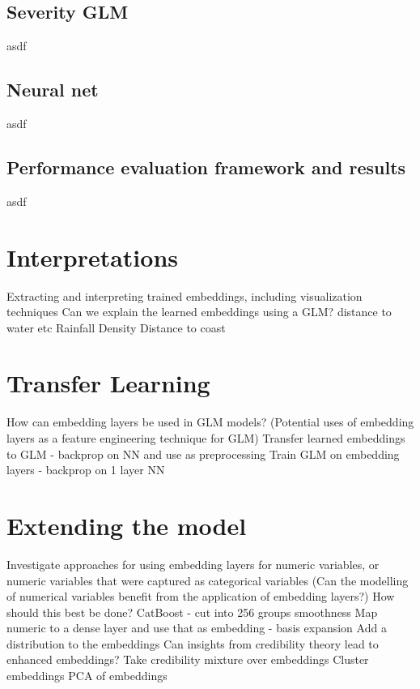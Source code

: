 \documentclass{article}
\begin{document}
\hypertarget{severity-glm}{%
\subsection{Severity GLM}\label{severity-glm}}

asdf

\hypertarget{neural-net}{%
\subsection{Neural net}\label{neural-net}}

asdf

\hypertarget{performance-evaluation-framework-and-results}{%
\subsection{Performance evaluation framework and
results}\label{performance-evaluation-framework-and-results}}

asdf

\hypertarget{interpretation}{%
\section{Interpretations}\label{interpretation}}

Extracting and interpreting trained embeddings, including visualization
techniques Can we explain the learned embeddings using a GLM? distance
to water etc Rainfall Density Distance to coast

\hypertarget{tl}{%
\section{Transfer Learning}\label{tl}}

How can embedding layers be used in GLM models? (Potential uses of
embedding layers as a feature engineering technique for GLM) Transfer
learned embeddings to GLM - backprop on NN and use as preprocessing
Train GLM on embedding layers - backprop on 1 layer NN

\hypertarget{extend}{%
\section{Extending the model}\label{extend}}

Investigate approaches for using embedding layers for numeric variables,
or numeric variables that were captured as categorical variables (Can
the modelling of numerical variables benefit from the application of
embedding layers?) How should this best be done? CatBoost - cut into 256
groups smoothness Map numeric to a dense layer and use that as embedding
- basis expansion Add a distribution to the embeddings Can insights from
credibility theory lead to enhanced embeddings? Take credibility mixture
over embeddings Cluster embeddings PCA of embeddings
\end{document}
